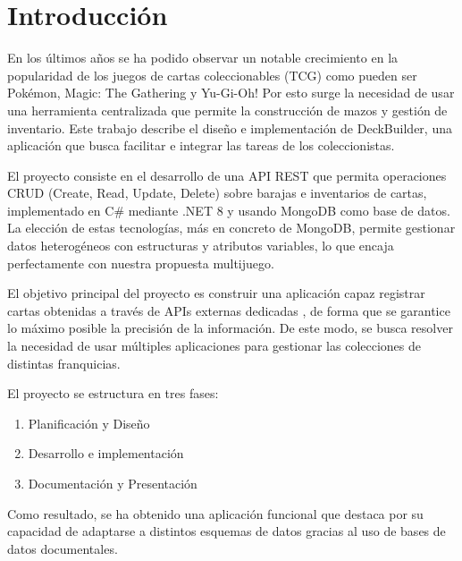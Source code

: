 \chapter{Introducción}\label{cap:introduccion}

En los últimos años se ha podido observar un notable crecimiento en la popularidad de los juegos de cartas coleccionables (TCG) como pueden ser Pokémon, Magic: The Gathering y Yu-Gi-Oh! Por esto surge la necesidad de usar una herramienta centralizada que permite la construcción de mazos y gestión de inventario. Este trabajo describe el diseño e implementación de DeckBuilder, una aplicación que busca facilitar e integrar las tareas de los coleccionistas.

El proyecto consiste en el desarrollo de una API REST que permita operaciones CRUD (Create, Read, Update, Delete) sobre barajas e inventarios de cartas, implementado en C\# mediante .NET 8 y usando MongoDB como base de datos. La elección de estas tecnologías, más en concreto de MongoDB, permite gestionar datos heterogéneos con estructuras y atributos variables, lo que encaja perfectamente con nuestra propuesta multijuego.

El objetivo principal del proyecto es construir una aplicación capaz registrar cartas obtenidas a través de APIs externas dedicadas \cite{tcgdexApi,scryfallApi,ygoprodeckApi}, de forma que se garantice lo máximo posible la precisión de la información. De este modo, se busca resolver la necesidad de usar múltiples aplicaciones para gestionar las colecciones de distintas franquicias.

El proyecto se estructura en tres fases:

\begin{enumerate}
    \item Planificación y Diseño
    \item Desarrollo e implementación
    \item Documentación y Presentación
\end{enumerate}

Como resultado, se ha obtenido una aplicación funcional que destaca por su capacidad de adaptarse a distintos esquemas de datos gracias al uso de bases de datos documentales.
